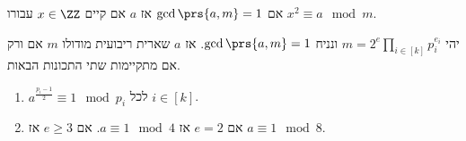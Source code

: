 \documentclass[a4paper,10pt,twoside,openany]{book}
\begin{document}
\begin{definition}
אם
$\gcd\prs{a,m} = 1$
אז
$a$
אם קיים
$x \in \ZZ$
עבורו
$x^2 \equiv a \mod{m}$.
\end{definition}

\begin{proposition}
יהי
$m = 2^e \prod_{i \in [k]} p_i^{e_i}$
ונניח
$\gcd\prs{a,m} = 1$.
אז
$a$
שארית ריבועית מודולו
$m$
אם ורק אם מתקיימות שתי התכונות הבאות.
\begin{enumerate}
\item $a^{\frac{p_i - 1}{2}} \equiv 1 \mod{p_i}$
לכל
$i \in [k]$.
\item אם
$e = 2$
אז
$a \equiv 1 \mod{4}$.
אם
$e \geq 3$
אז
$a \equiv 1 \mod{8}$.
\end{enumerate}
\end{proposition}
\end{document}
